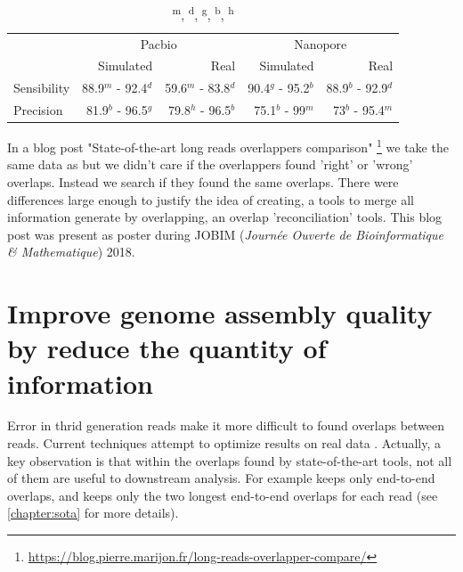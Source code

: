 \documentclass[main.tex]{subfiles}
\begin{document}
\begin{table}[ht]
    \centering
    \begin{tabular}{l|rr|rr}
                & \multicolumn{2}{c}{Pacbio}                & \multicolumn{2}{c}{Nanopore}              \\ 
                & Simulated           & Real                & Simulated         & Real                  \\ \hline
    Sensibility & 88.9$^m$ - 92.4$^d$ & 59.6$^m$ - 83.8$^d$ & 90.4$^g$ - 95.2$^b$ & 88.9$^b$ - 92.9$^d$ \\
    Precision   & 81.9$^b$ - 96.5$^g$ & 79.8$^h$ - 96.5$^b$ & 75.1$^b$ - 99$^m$   & 73$^b$ - 95.4$^m$   \\
    \end{tabular}
    \caption{\textsuperscript{m}, \textsuperscript{d}, \textsuperscript{g}, \textsuperscript{b}, \textsuperscript{h}\mhap}
    \label{preassembly:tab:ovl_result}
\end{table}

In a blog post "State-of-the-art long reads overlappers comparison" \footnote{\url{https://blog.pierre.marijon.fr/long-reads-overlapper-compare/}} we take the same data as \cite{ovl_bench} but we didn't care if the overlappers found 'right' or 'wrong' overlaps. Instead we search if they found the same overlaps. There were differences large enough to justify the idea of creating, a tools to merge all information generate by overlapping, an overlap 'reconciliation' tools. This blog post was present as poster during JOBIM (\textit{Journée Ouverte de Bioinformatique \& Mathematique}) 2018.




\section{Improve genome assembly quality by reduce the quantity of information} \label{sec:preasm:intro_fpa}

Error in thrid generation reads make it more difficult to found overlaps between reads. Current techniques attempt to optimize results on real data \cite{ovl_bench}.
Actually, a key observation is that within the overlaps found by state-of-the-art tools, not all of them are useful to downstream analysis. For example \miniasm keeps only end-to-end overlaps, and \canu keeps only the two longest end-to-end overlaps for each read (see \ref{chapter:sota} for more details).
\end{document}

